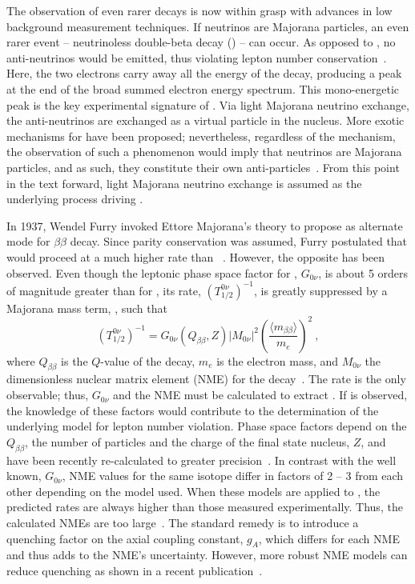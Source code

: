 The observation of even rarer decays is now within grasp with advances in low background measurement techniques. If neutrinos are Majorana particles, an even rarer event -- neutrinoless double-beta decay (\novbb{}) -- can occur. As opposed to \twovbb{}, no anti-neutrinos would be emitted, thus violating lepton number conservation~\cite{0vbb_theory}. Here, the two electrons carry away all the energy of the decay, producing a peak at the end of the broad \twovbb{} summed electron energy spectrum. This mono-energetic peak is the key experimental signature of \novbb{}. Via light Majorana neutrino exchange, the anti-neutrinos are exchanged as a virtual particle in the nucleus. More exotic mechanisms for \novbb{} have been proposed; nevertheless, regardless of the mechanism, the observation of such a phenomenon would imply that neutrinos are Majorana particles, and as such, they constitute their own anti-particles~\cite{valletheo}. From this point in the text forward, light Majorana neutrino exchange is assumed as the underlying process driving \novbb{}.

In 1937, Wendel Furry invoked Ettore Majorana's theory to propose \novbb{} as alternate mode for $\beta\beta$ decay. Since parity conservation was assumed, Furry postulated that \novbb{} would proceed at a much higher rate than \twovbb{}~\cite{wendell}. However, the opposite has been observed. Even though the leptonic phase space factor for \novbb{}, $G_{0\nu}$, is about 5 orders of magnitude greater than for \twovbb{}, its rate, $(T^{0\nu}_{1/2})^{-1}$, is greatly suppressed by a Majorana mass term, \mbb, such that
\begin{equation}
(T^{0\nu}_{1/2})^{-1} = G_{0\nu}(Q_{\beta\beta},Z)|M_{0\nu}|^2\left(\frac{\langle m_{\beta\beta} \rangle}{m_e}\right)^2~,
\label{eq:rate}
\end{equation}
where $Q_{\beta\beta}$ is the $Q$-value of the decay, $m_e$ is the electron mass, and $M_{0\nu}$ the dimensionless nuclear matrix element (NME) for the decay~\cite{Engel_2017}. The rate is the only observable; thus, $G_{0\nu}$ and the NME must be calculated to extract \mbb{}. If \novbb{} is observed, the knowledge of these factors would contribute to the determination of the underlying model for lepton number violation. Phase space factors depend on the $Q_{\beta\beta}$, the number of particles and the charge of the final state nucleus, $Z$, and have been recently re-calculated to greater precision~\cite{phasespace,phasespace2}. In contrast with the well known, $G_{0\nu}$, NME values for the same isotope differ in factors of 2 -- 3 from each other depending on the model used. When these models are applied to \twovbb{}, the predicted rates are always higher than those measured experimentally. Thus, the calculated NMEs are too large~\cite{jouniga}. The standard remedy is to introduce a quenching factor on the axial coupling constant, $g_A$, which differs for each NME and thus adds to the NME's uncertainty. However, more robust NME models can reduce quenching as shown in a recent publication~\cite{reduced_quenching}. 

